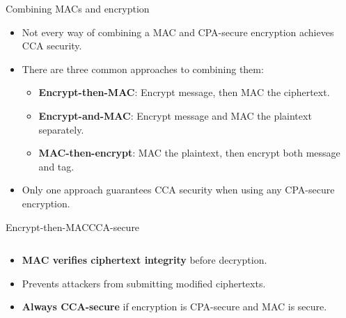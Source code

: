 \documentclass[aspectratio=169, lualatex, handout]{beamer}
\begin{document}
\begin{frame}{Combining MACs and encryption}
	\begin{itemize}
		\item Not every way of combining a MAC and CPA-secure encryption achieves CCA security.
		\item There are three common approaches to combining them:
		      \begin{itemize}
			      \item \textbf{Encrypt-then-MAC}: Encrypt message, then MAC the ciphertext.
			      \item \textbf{Encrypt-and-MAC}: Encrypt message and MAC the plaintext separately.
			      \item \textbf{MAC-then-encrypt}: MAC the plaintext, then encrypt both message and tag.
		      \end{itemize}
		\item Only one approach guarantees CCA security when using any CPA-secure encryption.
	\end{itemize}
\end{frame}

\begin{frame}{Encrypt-then-MAC}{CCA-secure}
	\begin{columns}[c]
		\begin{column}{0.5\textwidth}
			\begin{itemize}
				\item \textbf{MAC verifies ciphertext integrity} before decryption.
				\item Prevents attackers from submitting modified ciphertexts.
				\item \textbf{Always CCA-secure} if encryption is CPA-secure and MAC is secure.
			\end{itemize}
		\end{column}
		\begin{column}{0.5\textwidth}
		\end{column}
	\end{columns}
\end{frame}
\end{document}
